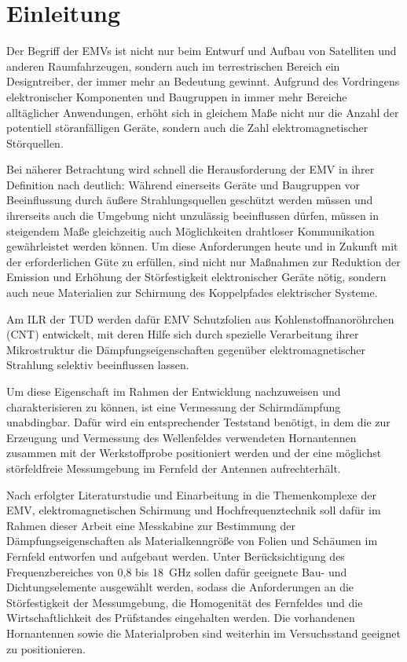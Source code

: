 

\chapter{Einleitung}\label{cha:1}

Der Begriff der \acp{EMV} ist nicht nur beim Entwurf und Aufbau von Satelliten und anderen Raumfahrzeugen, sondern auch im terrestrischen Bereich ein Designtreiber, der immer mehr an Bedeutung gewinnt. Aufgrund des Vordringens elektronischer Komponenten und Baugruppen in immer mehr Bereiche alltäglicher Anwendungen, erhöht sich in gleichem Maße nicht nur die Anzahl der potentiell störanfälligen Geräte, sondern auch die Zahl elektromagnetischer Störquellen. \par
\vspace{\linespace}
Bei näherer Betrachtung wird schnell die Herausforderung der \ac{EMV} in ihrer Definition nach \cite{VDE_0870} deutlich: Während einerseits Geräte und Baugruppen vor Beeinflussung durch äußere Strahlungsquellen geschützt werden müssen und ihrerseits auch die Umgebung nicht unzulässig beeinflussen dürfen, müssen in steigendem Maße gleichzeitig auch Möglichkeiten drahtloser Kommunikation gewährleistet werden können. Um diese Anforderungen heute und in Zukunft mit der erforderlichen Güte zu erfüllen, sind nicht nur Maßnahmen zur Reduktion der Emission und Erhöhung der Störfestigkeit elektronischer Geräte nötig, sondern auch neue Materialien zur Schirmung des Koppelpfades elektrischer Systeme.
\par
\vspace{\linespace}
Am \ac{ILR} der \ac{TUD} werden dafür \ac{EMV} Schutzfolien aus Kohlenstoffnanoröhrchen (CNT)  entwickelt, mit deren Hilfe sich durch spezielle Verarbeitung ihrer Mikrostruktur die Dämpfungseigenschaften gegenüber elektromagnetischer Strahlung selektiv beeinflussen lassen. \par
\vspace{\linespace}
Um diese Eigenschaft im Rahmen der Entwicklung nachzuweisen und charakterisieren zu können, ist eine Vermessung der Schirmdämpfung unabdingbar. Dafür wird ein entsprechender Teststand benötigt, in dem die zur Erzeugung und Vermessung des Wellenfeldes verwendeten Hornantennen zusammen mit der Werkstoffprobe positioniert werden und der eine möglichst störfeldfreie Messumgebung im Fernfeld der Antennen aufrechterhält.
\par
\vspace{\linespace}
Nach erfolgter Literaturstudie und Einarbeitung in die Themenkomplexe der EMV, elektromagnetischen Schirmung und Hochfrequenztechnik soll dafür im Rahmen dieser Arbeit eine Messkabine zur Bestimmung der Dämpfungseigenschaften als Materialkenngröße von Folien und Schäumen im Fernfeld entworfen und aufgebaut werden. Unter Berücksichtigung des Frequenzbereiches von 0,8 bis \SI{18}{\giga\hertz} sollen dafür geeignete Bau- und Dichtungselemente ausgewählt werden, sodass die Anforderungen an die Störfestigkeit der Messumgebung, die Homogenität des Fernfeldes und die Wirtschaftlichkeit des Prüfstandes eingehalten werden. Die vorhandenen Hornantennen sowie die Materialproben sind weiterhin im Versuchsstand geeignet zu positionieren.
